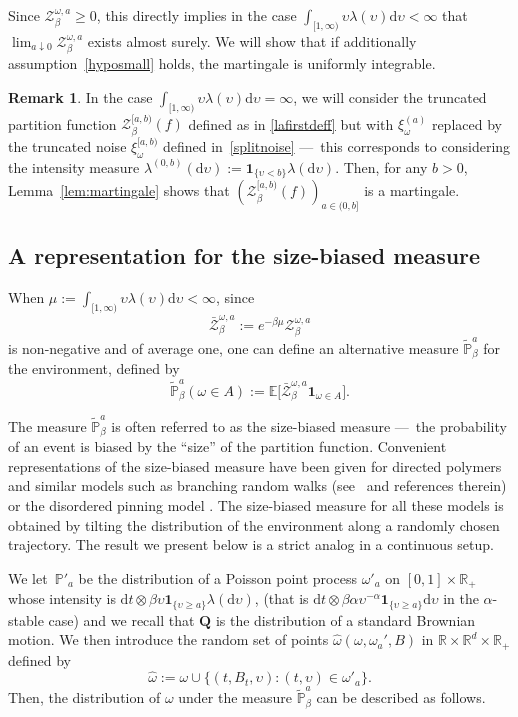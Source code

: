 \documentclass[11pt]{article}
\newcommand{\Subsection}{\subsection}
\numberwithin{equation}{section}
\let\mathcal\mathscr
\let\sep:
\theoremstyle{definition}
\newtheorem{rem}[theorem]{Remark}
\newcommand{\dd}{\mathrm{d}}
\newcommand{\ind}{\mathbf{1}}
\newcommand{\cZ}{{\ensuremath{\mathcal Z}} }
\newcommand{\bQ}{{\ensuremath{\mathbf Q}} }
\newcommand{\bbE}{{\ensuremath{\mathbb E}} }
\newcommand{\bbP}{{\ensuremath{\mathbb P}} }
\newcommand{\bbR}{{\ensuremath{\mathbb R}} }
\let\gb\beta
\let\gl\lambda
\let\ups\upsilon
\let\go\omega
\begin{document}
Since $\cZ_{\gb}^{\go,a}\geq 0$, this directly implies
in the case $\int_{[1,\infty)} \ups \gl(\ups)\dd \ups<\infty$ that $\lim_{a\downarrow 0}\cZ^{\go,a}_{\beta}$ exists almost surely.
We will show that if additionally assumption~\eqref{hyposmall} holds,
the martingale is uniformly integrable.

\begin{rem}
In the case $\int_{[1,\infty)} \ups \gl(\ups)\dd \ups=\infty$,
we will consider the
truncated partition function
$\cZ_{\gb}^{[a,b)}(f)$ defined as in \eqref{lafirstdeff} but with $\xi_{\go}^{(a)}$ replaced by the truncated noise $\xi_{\go}^{[a,b)}$ defined in~\eqref{splitnoise} ---~this corresponds to considering
the intensity measure $\lambda^{(0,b)} (\dd \ups) := \ind_{\{\ups < b\}} \lambda(\dd \ups)$.
Then, for any $b>0$, Lemma~\ref{lem:martingale} shows that $(\cZ_{\gb}^{[a,b)}(f))_{a\in (0,b]}$ is a martingale.
\end{rem}

\Subsection{A representation for the size-biased measure}
When $\mu:=\int_{[1,\infty)} \ups \gl(\ups)\dd \ups<\infty$, since
\[
\bar \cZ^{\go,a}_{\beta}:= e^{-\beta \mu} \cZ_{\gb}^{\go,a}
\]
is non-negative and of average one, one can define
an alternative measure $\tilde \bbP^a_{\beta}$ for the environment, defined by
\begin{equation}
\label{tildemeasure}
\tilde \bbP^a_{\beta}(\go\in A):= \bbE\bigl[ \bar \cZ_{\gb}^{\go,a} \ind_{\go\in A}\bigr].
\end{equation}

The measure $\tilde \bbP^a_{\beta}$ is often referred to as the size-biased measure
---~the probability of an event is biased by the ``size'' of the partition function.
Convenient representations of the size-biased measure have been given for directed polymers \cite[Lem.\,1]{Bir04} and similar models such as branching random walks (see~\cite[Ch.\,4]{ShiBRW} and references therein) or the disordered pinning model \cite[\S5.2]{LS17}.
The size-biased measure for all these models is obtained by tilting the distribution
of the environment along a randomly chosen trajectory.
The result we present below is a strict analog in a continuous setup.

We let~$\bbP'_a$ be the distribution of a Poisson point process $\go'_a$ on $[0,1]\times\bbR_+$ whose intensity is $\dd t \otimes \beta \ups \ind_{\{\ups \geq a\}}\gl(\dd \ups)$, (that is $\dd t \otimes \beta\alpha \ups^{-\alpha}\ind_{\{\ups \geq a\}} \dd \ups$ in the $\alpha$-stable case)
and we recall that $\bQ$ is the distribution
of a standard Brownian motion.
We then introduce the random set of points $\hat \go(\go, \go_a',B)$ in $\bbR\times \bbR^{d}\times \bbR_+$ defined by
\begin{equation}
\label{def:hatomega}
\hat \go:= \go \cup \bigl\{ (t,B_t,\ups) \sep (t,\ups)\in \go'_a \bigr\}.
\end{equation}
Then, the distribution of $\omega$ under the measure $\tilde \bbP^a_{\beta}$ can be described as follows.
\end{document}
